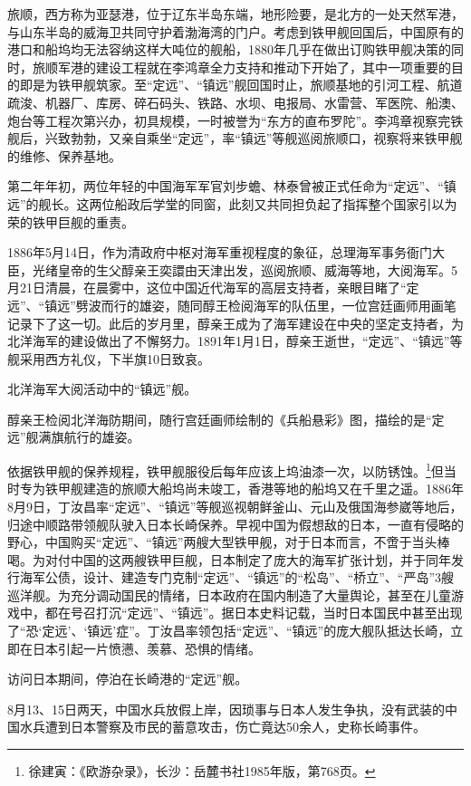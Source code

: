 \documentclass[12pt,UTF8]{ctexbook}
\begin{document}
旅顺，西方称为亚瑟港，位于辽东半岛东端，地形险要，是北方的一处天然军港，与山东半岛的威海卫共同守护着渤海湾的门户。考虑到铁甲舰回国后，中国原有的港口和船坞均无法容纳这样大吨位的舰船，1880年几乎在做出订购铁甲舰决策的同时，旅顺军港的建设工程就在李鸿章全力支持和推动下开始了，其中一项重要的目的即是为铁甲舰筑家。至“定远”、“镇远”舰回国时止，旅顺基地的引河工程、航道疏浚、机器厂、库房、碎石码头、铁路、水坝、电报局、水雷营、军医院、船澳、炮台等工程次第兴办，初具规模，一时被誉为“东方的直布罗陀”。李鸿章视察完铁舰后，兴致勃勃，又亲自乘坐“定远”，率“镇远”等舰巡阅旅顺口，视察将来铁甲舰的维修、保养基地。

第二年年初，两位年轻的中国海军军官刘步蟾、林泰曾被正式任命为“定远”、“镇远”的舰长。这两位船政后学堂的同窗，此刻又共同担负起了指挥整个国家引以为荣的铁甲巨舰的重责。

1886年5月14日，作为清政府中枢对海军重视程度的象征，总理海军事务衙门大臣，光绪皇帝的生父醇亲王奕譞由天津出发，巡阅旅顺、威海等地，大阅海军。5月21日清晨，在晨雾中，这位中国近代海军的高层支持者，亲眼目睹了“定远”、“镇远”劈波而行的雄姿，随同醇王检阅海军的队伍里，一位宫廷画师用画笔记录下了这一切。此后的岁月里，醇亲王成为了海军建设在中央的坚定支持者，为北洋海军的建设做出了不懈努力。1891年1月1日，醇亲王逝世，“定远”、“镇远”等舰采用西方礼仪，下半旗10日致哀。

北洋海军大阅活动中的“镇远”舰。

醇亲王检阅北洋海防期间，随行宫廷画师绘制的《兵船悬彩》图，描绘的是“定远”舰满旗航行的雄姿。

依据铁甲舰的保养规程，铁甲舰服役后每年应该上坞油漆一次，以防锈蚀。\footnote{徐建寅：《欧游杂录》，长沙：岳麓书社1985年版，第768页。}但当时专为铁甲舰建造的旅顺大船坞尚未竣工，香港等地的船坞又在千里之遥。1886年8月9日，丁汝昌率“定远”、“镇远”等舰巡视朝鲜釜山、元山及俄国海参崴等地后，归途中顺路带领舰队驶入日本长崎保养。早视中国为假想敌的日本，一直有侵略的野心，中国购买“定远”、“镇远”两艘大型铁甲舰，对于日本而言，不啻于当头棒喝。为对付中国的这两艘铁甲巨舰，日本制定了庞大的海军扩张计划，并于同年发行海军公债，设计、建造专门克制“定远”、“镇远”的“松岛”、“桥立”、“严岛”3艘巡洋舰。为充分调动国民的情绪，日本政府在国内制造了大量舆论，甚至在儿童游戏中，都在号召打沉“定远”、“镇远”。据日本史料记载，当时日本国民中甚至出现了“恐‘定远’、‘镇远’症”。丁汝昌率领包括“定远”、“镇远”的庞大舰队抵达长崎，立即在日本引起一片愤懑、羡慕、恐惧的情绪。

访问日本期间，停泊在长崎港的“定远”舰。

8月13、15日两天，中国水兵放假上岸，因琐事与日本人发生争执，没有武装的中国水兵遭到日本警察及市民的蓄意攻击，伤亡竟达50余人，史称长崎事件。
\end{document}
